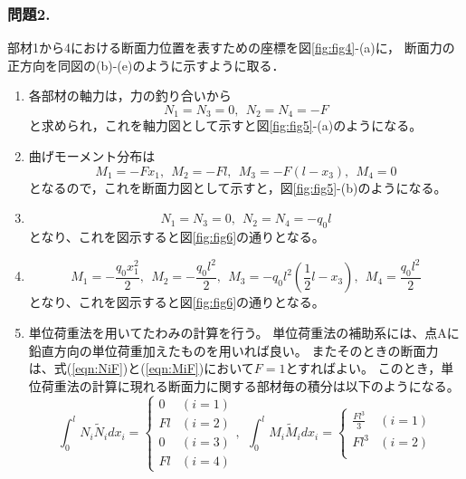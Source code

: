 \documentclass[10pt,a4j]{jarticle}
\begin{document}
\subsubsection*{問題2.}
部材1から4における断面力位置を表すための座標を図\ref{fig:fig4}-(a)に，
断面力の正方向を同図の(b)-(e)のように示すように取る．
\begin{enumerate}
\item
	各部材の軸力は，力の釣り合いから
	\begin{equation}
		N_1=N_3=0, \ \ N_2=N_4=-F
		\label{eqn:NiF}
	\end{equation}
	と求められ，これを軸力図として示すと図\ref{fig:fig5}-(a)のようになる。
\item
	曲げモーメント分布は
	\begin{equation}
		M_1=-Fx_1, \ \ M_2=-Fl, \ \ M_3=-F(l-x_3), \ \ M_4=0
		\label{eqn:MiF}
	\end{equation}
	となるので，これを断面力図として示すと，図\ref{fig:fig5}-(b)のようになる。
\item
	\begin{equation}
		N_1=N_3=0, \ \ N_2=N_4=-q_0l
		\label{eqn:Niq}
	\end{equation}
	となり、これを図示すると図\ref{fig:fig6}の通りとなる。
\item
	\begin{equation}
		M_1=-\frac{q_0x_1^2}{2}, \ \ M_2=-\frac{q_0l^2}{2}, \ \ M_3=-q_0l^2\left(\frac{1}{2}l-x_3\right), \ \ M_4=\frac{q_0l^2}{2}
		\label{eqn:Miq}
	\end{equation}
	となり、これを図示すると図\ref{fig:fig6}の通りとなる。
\item
	単位荷重法を用いてたわみの計算を行う。
	単位荷重法の補助系には、点Aに鉛直方向の単位荷重加えたものを用いれば良い。
	またそのときの断面力は、式(\ref{eqn:NiF})と(\ref{eqn:MiF})において$F=1$とすればよい。
	このとき，単位荷重法の計算に現れる断面力に関する部材毎の積分は以下のようになる。
	\begin{equation}
		\int_0^l 
			N_i \tilde{N}_i dx_i = 
		\left\{
		\begin{array}{cc}
			0 & (i=1) \\
			Fl& (i=2) \\
			0 & (i=3) \\
			Fl & (i=4)
		\end{array}
		\right.
		, \ \
		\int_0^l 
			M_i \tilde{M}_i dx_i = 
		\left\{
		\begin{array}{cc}
			\frac{Fl^3}{3} & (i=1) \\
			Fl^3 & (i=2) \\

\end{array}
\end{equation}
\end{enumerate}
\end{document}

